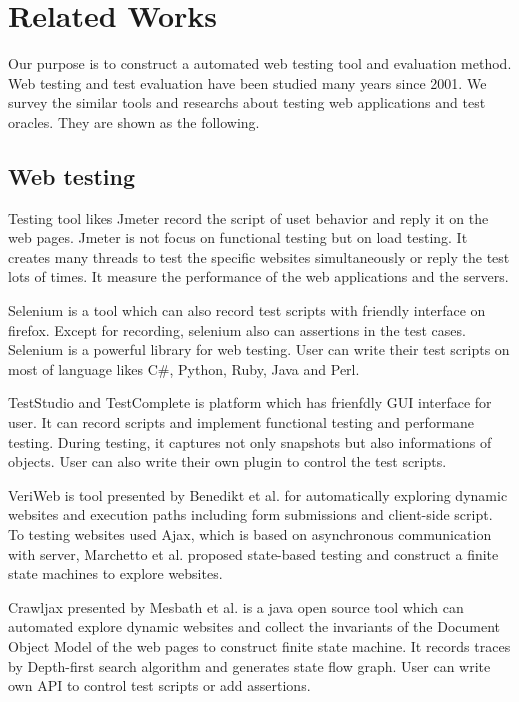 
\chapter{Related Works}\label{ch:related}

Our purpose is to construct a automated web testing tool and evaluation method.
Web testing and test evaluation have been studied many years since 2001\cite{WebTesting}.
We survey the similar tools\cite{WebToolsList}  and researchs about testing web applications and test oracles.
They are shown as the following.


\section{Web testing}

Testing tool likes Jmeter\cite{jmeter} record the script of uset behavior and reply it on the web pages.
Jmeter is not focus on functional testing but on load testing.
It creates many threads to test the specific websites simultaneously or reply the test lots of times.
It measure the performance of the web applications and the servers.

Selenium\cite{selenium} is a tool which can also record test scripts with friendly interface on firefox.
Except for recording, selenium also can assertions in the test cases.
Selenium is a powerful library for web testing.
User can write their test scripts on most of language likes C\#, Python, Ruby, Java and Perl.

TestStudio\cite{Teststudio} and TestComplete\cite{Smartbear} is platform which has frienfdly GUI interface for user.
It can record scripts and implement functional testing and performane testing.
During testing, it captures not only snapshots but also informations of objects.
User can also write their own plugin to control the test scripts.

VeriWeb is tool presented by Benedikt et al.\cite{veriweb}
for automatically exploring dynamic websites and execution paths including form submissions and client-side script.
To testing websites used Ajax, which is based on asynchronous communication with server,
Marchetto et al.\cite{Search-BasedTesting} proposed state-based testing and construct a finite state machines to explore websites.

Crawljax\cite{crawljax} presented by Mesbath et al. is a java open source tool 
which can automated explore dynamic websites and 
collect the invariants of the Document Object Model of the web pages to construct finite state machine.
It records traces by Depth-first search algorithm and generates state flow graph.
User can write own API to control test scripts or add assertions.

